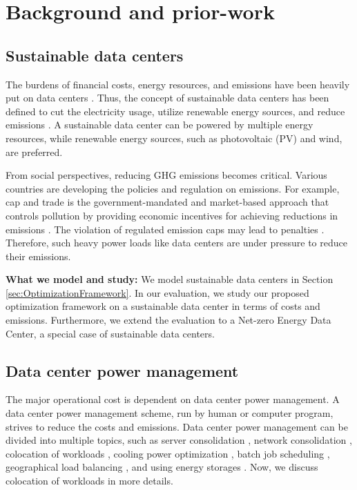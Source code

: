 \section{Background and prior-work}

\subsection{Sustainable data centers}

The burdens of financial costs, energy resources, and emissions have been heavily put on data centers \cite{koomey2008worldwide}. Thus, the concept of sustainable data centers has been defined to cut the electricity usage, utilize renewable energy sources, and reduce emissions \cite{weihl2011sustainable}. A sustainable data center can be powered by multiple energy resources, while renewable energy sources, such as photovoltaic (PV) and wind, are preferred.

From social perspectives, reducing GHG emissions becomes critical. Various countries are developing the policies and regulation on emissions. For example, cap and trade is the government-mandated and market-based approach that controls pollution by providing economic incentives for achieving reductions in emissions \cite{stavins2003experience}. The violation of regulated emission caps may lead to penalties \cite{revelle2009cap}. Therefore, such heavy power loads like data centers are under pressure to reduce their emissions.

\textbf{What we model and study:} We model sustainable data centers in Section \ref{sec:OptimizationFramework}. In our evaluation, we study our proposed optimization framework on a sustainable data center in terms of costs and emissions. Furthermore, we extend the evaluation to a Net-zero Energy Data Center, a special case of sustainable data centers.

\subsection{Data center power management}

The major operational cost is dependent on data center power management. A data center power management scheme, run by human or computer program, strives to reduce the costs and emissions. Data center power management can be divided into multiple topics, such as server consolidation \cite{lin2013dynamic,zhang2012dynamic,lin2011online}, network consolidation \cite{andrews2012routing,zhang2010greente,sharmashrink}, colocation of workloads \cite{aksanli2012utilizing}, cooling power optimization \cite{liu2012renewable,pakbaznia2009minimizing}, batch job scheduling \cite{mukherjee2009spatio,garg2011sla}, geographical load balancing \cite{qureshi2009cutting,liu2011greening}, and using energy storages \cite{urgaonkar2011optimal,liu2012renewable,liu2013data}. Now, we discuss colocation of workloads in more details.

